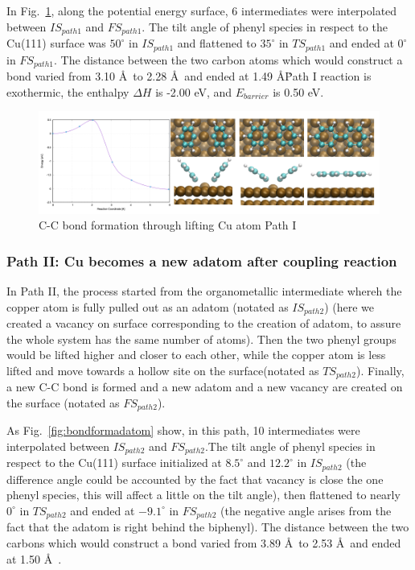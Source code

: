 \documentclass[%
 reprint,
 amsmath,amssymb,
 aps,
prb,
]{revtex4-2}
\begin{document}
In Fig.~\ref{fig:bondformlift}, along the potential energy surface, 6 intermediates were interpolated between $IS_{path1}$ and $FS_{path1}$. The tilt angle of phenyl species in respect to the Cu(111) surface was $50^\circ$ in $IS_{path1}$ and flattened to $35^\circ$ in $TS_{path1}$ and ended at $0^\circ$ in $FS_{path1}$. The distance between the two carbon atoms which would construct a bond varied from 3.10 \AA\ to 2.28 \AA\ and ended at 1.49 \AA\.

Path I reaction is exothermic, the enthalpy $\Delta H$ is -2.00 eV, and $E_{barrier}$ is 0.50 eV.

\begin{figure}[hbt]
\centering
\includegraphics[width=1.0\textwidth]{Fig/bondformlift.png}
\caption{C-C bond formation through lifting Cu atom Path I}
\label{fig:bondformlift}
\end{figure}


\subsubsection{Path II: Cu becomes a new adatom after coupling reaction}

In Path II, the process started from the organometallic intermediate whereh the copper atom is fully pulled out as an adatom (notated as $IS_{path2}$) (here we created a vacancy on surface corresponding to the creation of adatom, to assure the whole system has the same number of atoms). Then the two phenyl groups would be lifted higher and closer to each other, while the copper atom is less lifted and move towards a hollow site on the surface(notated as $TS_{path2}$). Finally, a new C-C bond is formed and a new adatom and a new vacancy are created on the surface (notated as $FS_{path2}$).

As Fig.~\ref{fig:bondformadatom} show, in this path, 10 intermediates were interpolated between $IS_{path2}$ and $FS_{path2}$.The tilt angle of phenyl species in respect to the Cu(111) surface initialized at $8.5^\circ$ and $12.2^\circ$ in $IS_{path2}$ (the difference angle could be accounted by the fact that vacancy is close the one phenyl species, this will affect a little on the tilt angle), then flattened to nearly $0^\circ$ in $TS_{path2}$ and ended at $-9.1^\circ$ in $FS_{path2}$ (the negative angle arises from the fact that the adatom is right behind the biphenyl). The distance between the two carbons which would construct a bond varied from 3.89 \AA\ to 2.53 \AA\ and ended at 1.50 \AA\ .
\end{document}

